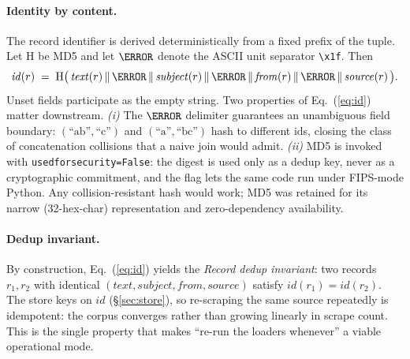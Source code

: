 \paragraph{Identity by content.}
The record identifier is derived deterministically from a fixed prefix of the
tuple. Let $\mathrm{H}$ be MD5 and let $\us$ denote the ASCII unit separator
\texttt{\textbackslash x1f}. Then
\begin{equation}
\mathit{id}(r) \;=\; \mathrm{H}\bigl(\, \mathit{text}(r) \,\Vert\, \us \,\Vert\, \mathit{subject}(r) \,\Vert\, \us \,\Vert\, \mathit{from}(r) \,\Vert\, \us \,\Vert\, \mathit{source}(r) \,\bigr).
\label{eq:id}
\end{equation}
Unset fields participate as the empty string. Two properties of
Eq.~(\ref{eq:id}) matter downstream.
\emph{(i)} The $\us$ delimiter guarantees an unambiguous field boundary:
$(\text{``ab''},\text{``c''})$ and $(\text{``a''},\text{``bc''})$ hash to
different ids, closing the class of concatenation collisions that a naive
join would admit.
\emph{(ii)} MD5 is invoked with \texttt{usedforsecurity=False}: the digest is
used only as a dedup key, never as a cryptographic commitment, and the flag
lets the same code run under FIPS-mode Python. Any collision-resistant hash
would work; MD5 was retained for its narrow (32-hex-char) representation and
zero-dependency availability.

\paragraph{Dedup invariant.}
By construction, Eq.~(\ref{eq:id}) yields the
\emph{Record dedup invariant}: two records $r_1, r_2$ with identical
$(\mathit{text}, \mathit{subject}, \mathit{from}, \mathit{source})$ satisfy
$\mathit{id}(r_1) = \mathit{id}(r_2)$. The store keys on $\mathit{id}$
(\S\ref{sec:store}), so re-scraping the same source repeatedly is idempotent:
the corpus converges rather than growing linearly in scrape count. This is the
single property that makes ``re-run the loaders whenever'' a viable
operational mode.

